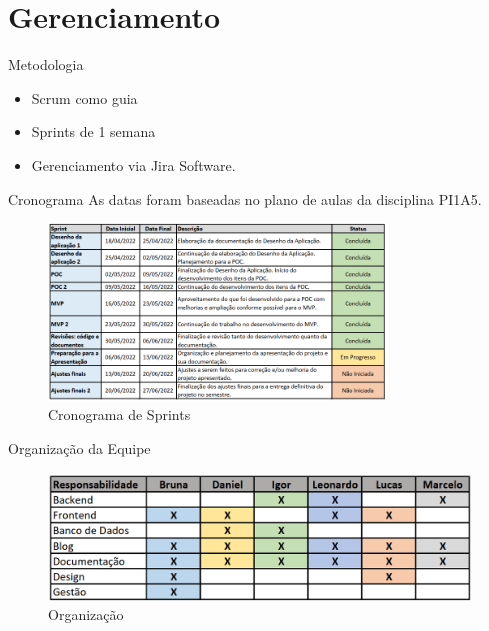 \documentclass[%
    english,
    brazil]{ifsp-spo-beamer}
\begin{document}
%
%
\section{Gerenciamento}
%
%
\begin{frame}{Metodologia} 
\begin{itemize}
  \item Scrum como guia
  \item Sprints de 1 semana
  \item Gerenciamento via Jira Software.
\end{itemize}
\end{frame}

%
%
\begin{frame}{Cronograma} 
As datas foram baseadas no plano de aulas da disciplina PI1A5.

	\begin{figure}
		\centering
		\caption{\label{fig-cronogramasem1}Cronograma de Sprints}
		\includegraphics[width=0.8\textwidth]{../../imagens/cronograma-sprints.png}
	\end{figure}
\end{frame}

%
%
\begin{frame}{Organização da Equipe} 
	\begin{figure}
		\centering
		\caption{\label{fig-org-team}Organização}
		\includegraphics[width=\textwidth]{../../imagens/organizacao-equipe.png}
	\end{figure}
\end{frame}
\end{document}

